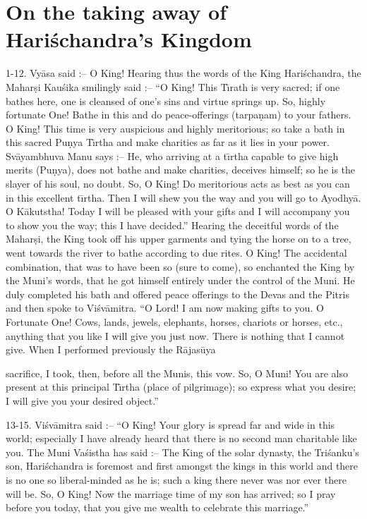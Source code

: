 \chapter{On the taking away of Hari\'schandra's Kingdom}

1-12. Vy\=asa said :-- O King! Hearing thus the words of the King Hari\'schandra, the Mahar\d{s}i Kau\'sika smilingly said :-- ``O King! This T\={\i}rath is very sacred; if one bathes here, one is cleansed of one's sins and virtue springs up. So, highly fortunate One! Bathe in this and do peace-offerings (tarpa\d{n}am) to your fathers. O King! This time is very auspicious and highly meritorious; so take a bath in this sacred Pu\d{n}ya T\={\i}rtha and make charities as far as it lies in your power. Sv\=ayambhuva Manu says :-- He, who arriving at a t\={\i}rtha capable to give high merits (Pu\d{n}ya), does not bathe and make charities, deceives himself; so he is the slayer of his soul, no doubt. So, O King! Do meritorious acts as best as you can in this excellent t\={\i}rtha. Then I will shew you the way and you will go to Ayodhy\=a. O K\=akutstha! Today I will be pleased with your gifts and I will accompany you to show you the way; this I have decided.'' Hearing the deceitful words of the Mahar\d{s}i, the King took off his upper garments and tying the horse on to a tree, went towards the river to bathe according to due rites. O King! The accidental combination, that was to have been so (sure to come), so enchanted the King by the Muni's words, that he got himself entirely under the control of the Muni. He duly completed his bath and offered peace offerings to the Devas and the Pitris and then spoke to Vi\'sv\=amitra. ``O Lord! I am now making gifts to you. O Fortunate One! Cows, lands, jewels, elephants, horses, chariots or horses, etc., anything that you like I will give you just now. There is nothing that I cannot give. When I performed previously the R\=ajas\=uya

sacrifice, I took, then, before all the Munis, this vow. So, O Muni! You are also present at this principal T\={\i}rtha (place of pilgrimage); so express what you desire; I will give you your desired object.''

13-15. Vi\'sv\=amitra said :-- ``O King! Your glory is spread far and wide in this world; especially I have already heard that there is no second man charitable like you. The Muni Va\'sistha has said :-- The
King of the solar dynasty, the Tri\'sanku's son, Hari\'schandra is foremost and first amongst the kings in this world and there is no one so liberal-minded as he is; such a king there never was nor ever there will be. So, O King! Now the marriage time of my son has arrived; so I pray before you today, that you give me wealth to celebrate this marriage.''

